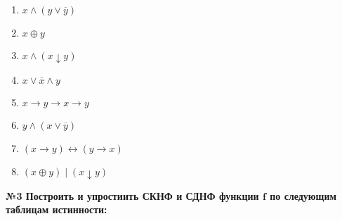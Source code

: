    \begin{minipage}[t]{0.4\textwidth}
        \begin{enumerate}
            \setcounter{enumi}{0}
            \item $x \wedge (y \vee \overline y)$
            \item $x \oplus y$
            \item $x \wedge (x \downarrow y)$
            \item $x \vee \overline x \wedge y$
        \end{enumerate}
    \end{minipage}
    \begin{minipage}[t]{0.4\textwidth}
        \begin{enumerate}
            \setcounter{enumi}{4}
            \item $x \rightarrow y \rightarrow x \rightarrow y$
            \item $y \wedge (x \vee \overline y)$
            \item $(x \rightarrow y) \leftrightarrow (y \rightarrow x)$
            \item $(x \oplus y) \mid (x \downarrow y)$
        \end{enumerate}
    \end{minipage}

    \begin{center}
        \textbf{№3 Построить и упростиить СКНФ и СДНФ функции $\textbf{f}$ по следующим таблицам истинности:}
    \end{center}

